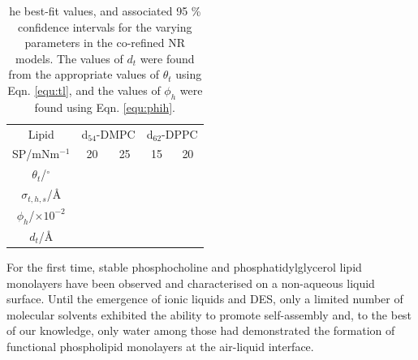 \documentclass[%
 reprint,
 amsmath,amssymb,
 prl,
]{revtex4-1}
\begin{document}
\begin{table}
	\caption{\label{tab:neutron} he best-fit values, and associated 95 \% confidence intervals for the varying parameters in the co-refined NR models. The values of $d_t$ were found from the appropriate values of $\theta_t$ using Eqn. \ref{equ:tl}, and the values of $\phi_h$ were found using Eqn. \ref{equ:phih}.}
  \begin{ruledtabular}
	\begin{tabular}{ccccc}
    Lipid & \multicolumn{2}{c}{d$_{54}$-DMPC} & \multicolumn{2}{c}{d$_{62}$-DPPC} \\
    SP/mNm$^{-1}$ & 20 & 25 & 15 & 20 \\
		\hline
		$\theta_t$/$^\circ$ &  &  &  &  \\
		$\sigma_{t,h,s}$/\AA &  &  &  &  \\
    \hline
    $\phi_h$/$\times10^{-2}$ &  &  &  &  \\
		$d_t$/\AA &  &  &  &  \\
	\end{tabular}
  \end{ruledtabular}
\end{table}
%

For the first time, stable phosphocholine and phosphatidylglycerol lipid monolayers have been observed and characterised on a non-aqueous liquid surface.
Until the emergence of ionic liquids and DES, only a limited number of molecular solvents exhibited the ability to promote self-assembly and, to the best of our knowledge, only water among those had demonstrated the formation of functional phospholipid monolayers at the air-liquid interface.
\end{document}
